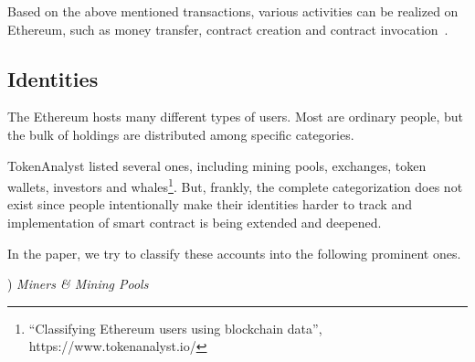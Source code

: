  

Based on the above mentioned transactions, various activities can be realized on Ethereum, such as money transfer, contract creation and contract invocation~\cite{chen2018infocom}. 



 
\subsection{Identities}
The Ethereum hosts many different types of users. Most are ordinary people, but the bulk of holdings are distributed among specific categories. 

TokenAnalyst listed several ones, including  mining pools, exchanges, token wallets, investors and whales\footnote{``Classifying Ethereum users using blockchain data'', https://www.tokenanalyst.io/}. But, frankly, the complete categorization does not exist since people intentionally make their identities harder to track and implementation of smart contract is being extended and deepened.

In the paper, we try to classify these accounts into the following prominent ones.


) \emph{Miners \& Mining Pools}

